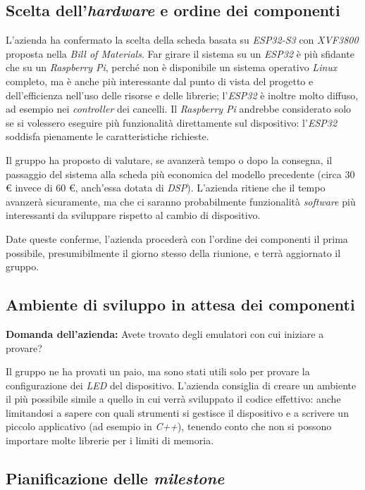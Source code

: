 \documentclass[12pt,a4paper]{article}
\begin{document}
\subsection{\texorpdfstring{Scelta dell'\emph{hardware} e ordine dei componenti}{Scelta dell'hardware e ordine dei componenti}}

L'azienda ha confermato la scelta della scheda basata su \emph{ESP32-S3} con \emph{XVF3800} proposta nella \emph{Bill of Materials}. Far girare il sistema su un \emph{ESP32} è più sfidante che su un \emph{Raspberry Pi}, perché non è disponibile un sistema operativo \emph{Linux} completo, ma è anche più interessante dal punto di vista del progetto e dell'efficienza nell'uso delle risorse e delle librerie; l'\emph{ESP32} è inoltre molto diffuso, ad esempio nei \emph{controller} dei cancelli. Il \emph{Raspberry Pi} andrebbe considerato solo se si volessero eseguire più funzionalità direttamente sul dispositivo: l'\emph{ESP32} soddisfa pienamente le caratteristiche richieste.

Il gruppo ha proposto di valutare, se avanzerà tempo o dopo la consegna, il passaggio del sistema alla scheda più economica del modello precedente (circa 30 € invece di 60 €, anch'essa dotata di \emph{DSP}). L'azienda ritiene che il tempo avanzerà sicuramente, ma che ci saranno probabilmente funzionalità \emph{software} più interessanti da sviluppare rispetto al cambio di dispositivo.

Date queste conferme, l'azienda procederà con l'ordine dei componenti il prima possibile, presumibilmente il giorno stesso della riunione, e terrà aggiornato il gruppo.

\subsection{Ambiente di sviluppo in attesa dei componenti}

\textbf{Domanda dell'azienda:} Avete trovato degli emulatori con cui iniziare a provare?

Il gruppo ne ha provati un paio, ma sono stati utili solo per provare la configurazione dei \emph{LED} del dispositivo. L'azienda consiglia di creare un ambiente il più possibile simile a quello in cui verrà sviluppato il codice effettivo: anche limitandosi a sapere con quali strumenti si gestisce il dispositivo e a scrivere un piccolo applicativo (ad esempio in \emph{C++}), tenendo conto che non si possono importare molte librerie per i limiti di memoria.

\subsection{\texorpdfstring{Pianificazione delle \emph{milestone}}{Pianificazione delle milestone}}
\end{document}
